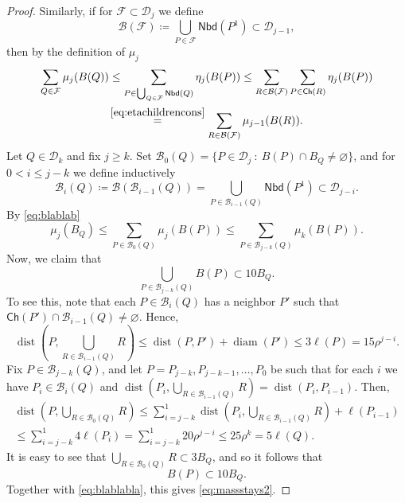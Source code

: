 \documentclass[11pt,reqno]{amsart}
\def\dB{{\mathcal{B}}}
\def\dF{{\mathcal{F}}}
\DeclareMathOperator{\diam}{diam}
\def\dist{\mathop\mathrm{dist}} 						%
\theoremstyle{definition}
\theoremstyle{remark}
\numberwithin{equation}{section}
\newcommand{\DD}{\mathcal{D}}
\newcommand{\Child}{\mathsf{Ch}}
\newcommand{\Nei}{\mathsf{Nbd}}
\theoremstyle{theorem}
\theoremstyle{definition}
\theoremstyle{remark}
\numberwithin{equation}{section}
\begin{document}
\begin{proof}
	Similarly, if for $\dF\subset\DD_j$ we define
	\begin{equation*}
	\mathcal{B}(\dF)\coloneqq \bigcup_{P\in\mathcal{F}}\Nei(P^1)\subset\DD_{j-1},
	\end{equation*}
	then by the definition of $\mu_j$
	\begin{multline}\label{eq:blablab}
	\sum_{Q\in\dF}\mu_j(B(Q))\le \sum_{P\in \bigcup_{Q\in\dF}\Nei(Q)} \eta_j(B(P)) \le \sum_{R\in\dB(\dF)} \sum_{P\in \Child(R)} \eta_j(B(P))\\
	 \overset{\eqref{eq:etachildrencons}}{=} \sum_{R\in\dB(\dF)} \mu_{j-1}(B(R)).
	\end{multline}
	Let $Q\in\DD_k$ and fix $j\ge k$. Set $\dB_0(Q) = \{ P\in\DD_j\ :\ B(P)\cap B_Q\neq\varnothing\}$, and for $0< i \le j-k$ we define inductively
	\begin{equation*}
	\dB_i(Q) \coloneqq \dB(\dB_{i-1}(Q)) = \bigcup_{P\in\dB_{i-1}(Q)}\Nei(P^1)\subset\DD_{j-i}.
	\end{equation*}
	By \eqref{eq:blablab}
	\begin{equation}\label{eq:blablabla}
	\mu_j(B_Q)\le \sum_{P\in\dB_0(Q)}\mu_j(B(P)) \le \sum_{P\in \dB_{j-k}(Q)}\mu_k(B(P)).
	\end{equation}
	Now, we claim that
	\begin{equation*}
	\bigcup_{P\in\dB_{j-k}(Q)}B(P) \subset 10B_Q.
	\end{equation*}
	To see this, note that each $P\in\dB_i(Q)$ has a neighbor $P'$ such that $\Child(P')\cap\dB_{i-1}(Q)\neq\varnothing.$ Hence, 
	\begin{equation*}
	\dist(P,\bigcup_{R\in \dB_{i-1}(Q)}R)\le \dist(P,P')+\diam(P')\le 3\ell(P)=15\rho^{j-i}.
	\end{equation*}
	Fix $P\in\dB_{j-k}(Q)$, and let $P=P_{j-k}, P_{j-k-1},\dots, P_{0}$ be such that for each $i$ we have $P_i\in\dB_i(Q)$ and $\dist(P_i,\bigcup_{R\in \dB_{i-1}(Q)}R)=\dist(P_i,P_{i-1})$. Then,
	\begin{multline*}
		\dist(P,\bigcup_{R\in \dB_{0}(Q)}R)\le \sum_{i=j-k}^{1} \dist(P_i,\bigcup_{R\in \dB_{i-1}(Q)}R) + \ell(P_{i-1})\\
		\le \sum_{i=j-k}^{1} 4\ell(P_{i})=\sum_{i=j-k}^{1} 20\rho^{j-i} \le 25\rho^{k} = 5\ell(Q).
	\end{multline*}
	It is easy to see that $\bigcup_{R\in \dB_{0}(Q)}R\subset 3B_Q$, and so it follows that
	\begin{equation*}
		B(P)\subset 10 B_Q.
	\end{equation*}
	Together with \eqref{eq:blablabla}, this gives \eqref{eq:massstays2}.
\end{proof}
\end{document}
